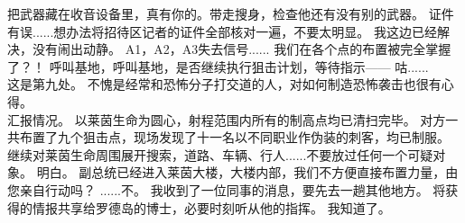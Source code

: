 \documentclass[openany]{book}
\begin{document}
\begin{dialogue}
     把武器藏在收音设备里，真有你的。带走搜身，检查他还有没有别的武器。
     证件有误......想办法将招待区记者的证件全部核对一遍，不要太明显。
     我这边已经解决，没有闹出动静。
     A1，A2，A3失去信号......
     我们在各个点的布置被完全掌握了？！
     呼叫基地，呼叫基地，是否继续执行狙击计划，等待指示——
     咕......
    \\
     这是第九处。
     不愧是经常和恐怖分子打交道的人，对如何制造恐怖袭击也很有心得。
    \\
     汇报情况。
     以莱茵生命为圆心，射程范围内所有的制高点均已清扫完毕。
     对方一共布置了九个狙击点，现场发现了十一名以不同职业作伪装的刺客，均已制服。
     继续对莱茵生命周围展开搜索，道路、车辆、行人......不要放过任何一个可疑对象。
     明白。
     副总统已经进入莱茵大楼，大楼内部，我们不方便直接布置力量，由您亲自行动吗？
     ......不。
     我收到了一位同事的消息，要先去一趟其他地方。
     将获得的情报共享给罗德岛的博士，必要时刻听从他的指挥。
     我知道了。
\end{dialogue}
\end{document}
